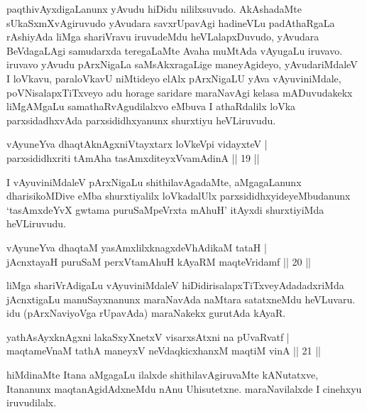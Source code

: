 \begin{artha}%
paqthivAyxdigaLanunx yAvudu hiDidu nililxsuvudo. AkAshadaMte sUkaSxmXvAgiruvudo yAvudara savxrUpavAgi hadineVLu padAthaRgaLa rAshiyAda liMga shariVravu iruvudeMdu heVLalapxDuvudo, yAvudara BeVdagaLAgi samudarxda teregaLaMte  Avaha muMtAda vAyugaLu iruvavo. iruvavo yAvudu pArxNigaLa saMsAkxragaLige maneyAgideyo, yAvudariMdaleV I loVkavu, paraloVkavU niMtideyo elAlx pArxNigaLU yAva vAyuviniMdale, poVNisalapxTiTxveyo adu horage saridare maraNavAgi kelasa mADuvudakekx liMgAMgaLu samathaRvAgudilalxvo eMbuva I athaRdalilx loVka parxsidadhxvAda parxsididhxyanunx shurxtiyu heVLiruvudu. 
\end{artha}

\begin{shl}
vAyuneYva dhaqtAknAgxniVtayxtarx loVkeV\s pi vidayxteV |\\
parxsididhxriti tAmAha tasAmxditeyxVvamAdinA \hfill || 19 ||
\end{shl}

\begin{artha}%
I vAyuviniMdaleV pArxNigaLu shithilavAgadaMte, aMgagaLanunx dharisikoMDive eMba shurxtiyalilx loVkadalUlx parxsididhxyideyeMbudanunx `tasAmxdeYvX gwtama puruSaMpeVrxta mAhuH' itAyxdi shurxtiyiMda heVLiruvudu.
\end{artha}


\begin{shl}
vAyuneYva dhaqtaM yasAmxlilxknagxdeVhAdikaM tataH |\\
jAcnxtayaH puruSaM perxVtamAhuH kAyaRM maqteVridamf \hfill || 20 ||
\end{shl}

\begin{artha}
liMga shariVrAdigaLu vAyuviniMdaleV hiDidirisalapxTiTxveyAdadadxriMda jAcnxtigaLu manuSayxnanunx maraNavAda naMtara satatxneMdu heVLuvaru. idu (pArxNaviyoVga rUpavAda) maraNakekx gurutAda kAyaR.
\end{artha}


\begin{shl}
yathA\s sAyxknAgxni lakaSxyXnetxV visarxsAtxni na pUvaRvatf |\\
maqtameVnaM tathA maneyxV neVdaqkicxhanxM maqtiM vinA \hfill || 21 ||
\end{shl}

\begin{artha}
hiMdinaMte Itana aMgagaLu ilalxde shithilavAgiruvaMte kANutatxve, Itananunx maqtanAgidAdxneMdu nAnu Uhisutetxne. maraNavilalxde I cinehxyu iruvudilalx.
\end{artha}

